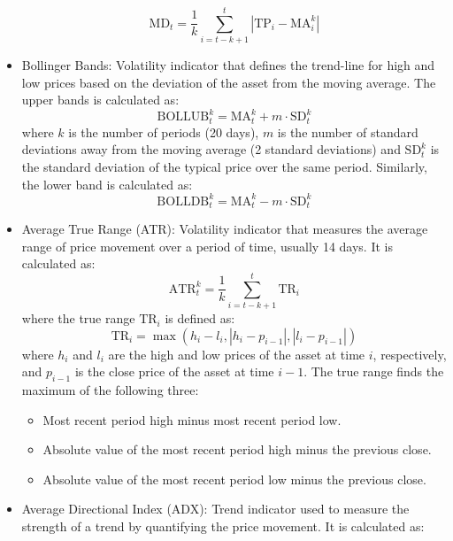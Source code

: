 \begin{itemize}
    \begin{equation}
        \text{MD}_t = \frac{1}{k} \sum_{i=t-k+1}^{t} \left| \text{TP}_i - \text{MA}_i^k \right|
    \end{equation}
    \item Bollinger Bands: Volatility indicator that defines the trend-line for high and low prices based on the deviation of the asset from the moving average. The upper bands is calculated as:
    \begin{equation}
        \text{BOLLUB}_t^k = \text{MA}_t^k + m \cdot \text{SD}_t^k
    \end{equation}
    where $k$ is the number of periods (20 days), $m$ is the number of standard deviations away from the moving average (2 standard deviations) and $\text{SD}_t^k$ is the standard deviation of the typical price over the same period. Similarly, the lower band is calculated as:
    \begin{equation}
        \text{BOLLDB}_t^k = \text{MA}_t^k - m \cdot \text{SD}_t^k
    \end{equation}
    \item Average True Range (ATR): Volatility indicator that measures the average range of price movement over a period of time, usually 14 days. It is calculated as:
    \begin{equation}
        \text{ATR}_t^k = \frac{1}{k} \sum_{i=t-k+1}^{t} \text{TR}_i
    \end{equation}
    where the true range $\text{TR}_i$ is defined as:
    \begin{equation}
        \text{TR}_i = \max \left( h_i - l_i, \left|h_i - p_{i-1}\right|, \left|l_i - p_{i-1}\right| \right)
    \end{equation}
    where $h_i$ and $l_i$ are the high and low prices of the asset at time $i$, respectively, and $p_{i-1}$ is the close price of the asset at time $i-1$. The true range finds the maximum of the following three: 
    \begin{itemize}
        \item Most recent period high minus most recent period low.
        \item Absolute value of the most recent period high minus the previous close.
        \item Absolute value of the most recent period low minus the previous close.
    \end{itemize}
    \item Average Directional Index (ADX): Trend indicator used to measure the strength of a trend by quantifying the price movement. It is calculated as:

\end{itemize}

